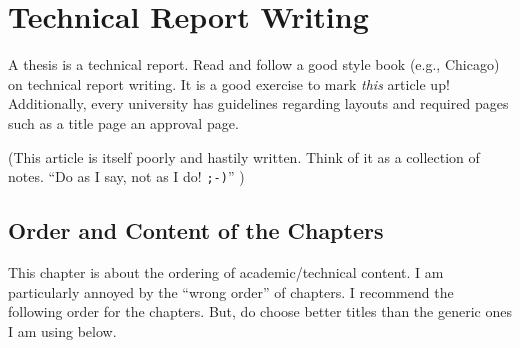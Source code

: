\chapter{Technical Report Writing}

A thesis is a technical report.  Read and follow a good style book
(e.g., Chicago) on technical report writing.  It is a good exercise to
mark {\em this} article up!  Additionally, every university has
guidelines regarding layouts and required pages such as a title page
an approval page.

(This article is itself poorly and hastily written.  Think of it as a
collection of notes.  ``Do as I say, not as I do! {\tt ;-)}'' )


\section{Order and Content of the Chapters}

This chapter is about the ordering of academic/technical content.  I
am particularly annoyed by the ``wrong order'' of chapters.  I
recommend the following order for the chapters.  But, do choose better
titles than the generic ones I am using below.

